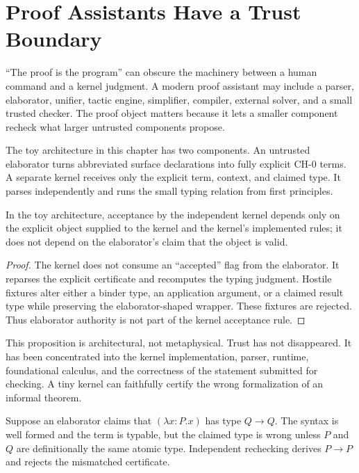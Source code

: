 \chapter{Proof Assistants Have a Trust Boundary}
\label{ch:trust-boundary}

“The proof is the program” can obscure the machinery between a human command and a kernel judgment. A modern proof assistant may include a parser, elaborator, unifier, tactic engine, simplifier, compiler, external solver, and a small trusted checker. The proof object matters because it lets a smaller component recheck what larger untrusted components propose.



The toy architecture in this chapter has two components. An untrusted elaborator turns abbreviated surface declarations into fully explicit $\mathrm{CH}\text{-}0$ terms. A separate kernel receives only the explicit term, context, and claimed type. It parses independently and runs the small typing relation from first principles.

\begin{proposition}
In the toy architecture, acceptance by the independent kernel depends only on the explicit object supplied to the kernel and the kernel's implemented rules; it does not depend on the elaborator's claim that the object is valid.
\end{proposition}
\begin{proof}
The kernel does not consume an “accepted” flag from the elaborator. It reparses the explicit certificate and recomputes the typing judgment. Hostile fixtures alter either a binder type, an application argument, or a claimed result type while preserving the elaborator-shaped wrapper. These fixtures are rejected. Thus elaborator authority is not part of the kernel acceptance rule.
\end{proof}



This proposition is architectural, not metaphysical. Trust has not disappeared. It has been concentrated into the kernel implementation, parser, runtime, foundational calculus, and the correctness of the statement submitted for checking. A tiny kernel can faithfully certify the wrong formalization of an informal theorem.

\begin{workedexample}[title={A plausible but invalid certificate}]
Suppose an elaborator claims that $(\lambda x{:}P.x)$ has type $Q\to Q$. The syntax is well formed and the term is typable, but the claimed type is wrong unless $P$ and $Q$ are definitionally the same atomic type. Independent rechecking derives $P\to P$ and rejects the mismatched certificate.
\end{workedexample}

